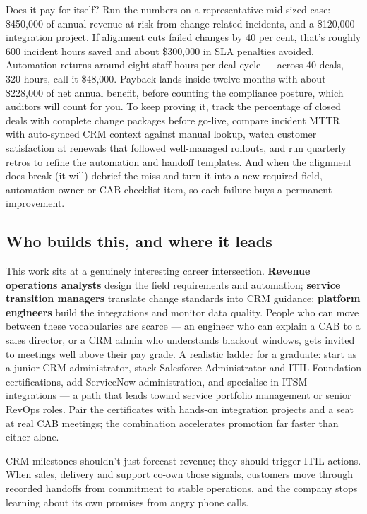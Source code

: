 Does it pay for itself? Run the numbers on a representative mid-sized case: \$450,000 of annual revenue at risk from change-related incidents, and a \$120,000 integration project. If alignment cuts failed changes by 40 per cent, that's roughly 600 incident hours saved and about \$300,000 in SLA penalties avoided. Automation returns around eight staff-hours per deal cycle — across 40 deals, 320 hours, call it \$48,000. Payback lands inside twelve months with about \$228,000 of net annual benefit, before counting the compliance posture, which auditors will count for you. To keep proving it, track the percentage of closed deals with complete change packages before go-live, compare incident MTTR with auto-synced CRM context against manual lookup, watch customer satisfaction at renewals that followed well-managed rollouts, and run quarterly retros to refine the automation and handoff templates. And when the alignment does break (it will) debrief the miss and turn it into a new required field, automation owner or CAB checklist item, so each failure buys a permanent improvement.



\subsection{Who builds this, and where it leads}


This work sits at a genuinely interesting career intersection. \textbf{Revenue operations analysts} design the field requirements and automation; \textbf{service transition managers} translate change standards into CRM guidance; \textbf{platform engineers} build the integrations and monitor data quality. People who can move between these vocabularies are scarce — an engineer who can explain a CAB to a sales director, or a CRM admin who understands blackout windows, gets invited to meetings well above their pay grade. A realistic ladder for a graduate: start as a junior CRM administrator, stack Salesforce Administrator and ITIL Foundation certifications, add ServiceNow administration, and specialise in ITSM integrations — a path that leads toward service portfolio management or senior RevOps roles. Pair the certificates with hands-on integration projects and a seat at real CAB meetings; the combination accelerates promotion far faster than either alone.


CRM milestones shouldn't just forecast revenue; they should trigger ITIL actions. When sales, delivery and support co-own those signals, customers move through recorded handoffs from commitment to stable operations, and the company stops learning about its own promises from angry phone calls.

